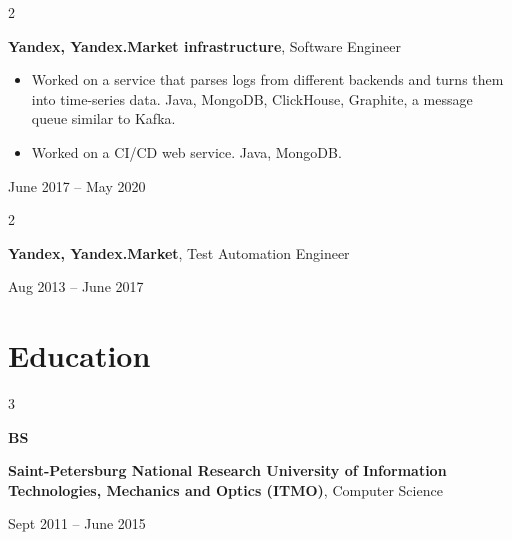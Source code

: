 \documentclass[11pt, letterpaper]{article}
\newenvironment{highlights}{
    \begin{itemize}[
        topsep=0.10 cm,
        parsep=0.10 cm,
        partopsep=0pt,
        itemsep=0pt,
        leftmargin=0.4 cm + 10pt
    ]
}{
    \end{itemize}
} %
\newenvironment{twocolentry}[2][]{
    \onecolentry
    \def\secondColumn{#2}
    \setcolumnwidth{\fill, 4.5 cm}
    \begin{paracol}{2}
}{
    \switchcolumn \raggedleft \secondColumn
    \end{paracol}
    \endonecolentry
} %
\newenvironment{threecolentry}[3][]{
    \onecolentry
    \def\thirdColumn{#3}
    \setcolumnwidth{1 cm, \fill, 4.5 cm}
    \begin{paracol}{3}
    {\raggedright #2} \switchcolumn
}{
    \switchcolumn \raggedleft \thirdColumn
    \end{paracol}
    \endonecolentry
} %
\begin{document}
        \vspace{0.2 cm}

        \begin{twocolentry}{
            June 2017 – May 2020
        }
            \textbf{Yandex, Yandex.Market infrastructure}, Software Engineer
            \begin{highlights}
                \item Worked on a service that parses logs from different backends and turns them into time-series data. Java, MongoDB, ClickHouse, Graphite, a message queue similar to Kafka.
                \item Worked on a CI/CD web service. Java, MongoDB.
            \end{highlights}
        \end{twocolentry}


        \vspace{0.2 cm}

        \begin{twocolentry}{
            Aug 2013 – June 2017
        }
            \textbf{Yandex, Yandex.Market}, Test Automation Engineer
        \end{twocolentry}



    
    \section{Education}



        
        \begin{threecolentry}{\textbf{BS}}{
            Sept 2011 – June 2015
        }
            \textbf{Saint-Petersburg National Research University of Information Technologies, Mechanics and Optics (ITMO)}, Computer Science
        \end{threecolentry}


    
\end{document}
